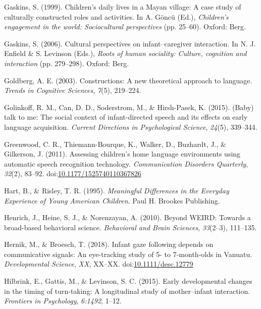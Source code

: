\documentclass[floatsintext,man]{apa6}
\theoremstyle{definition}
\theoremstyle{definition}
\theoremstyle{definition}
\theoremstyle{remark}
\begin{document}
\hypertarget{ref-gaskins1999childrens}{}
Gaskins, S. (1999). Children's daily lives in a Mayan village: A case
study of culturally constructed roles and activities. In A. Göncü (Ed.),
\emph{Children's engagement in the world: Sociocultural perspectives}
(pp. 25--60). Oxford: Berg.

\hypertarget{ref-gaskins2006cultural}{}
Gaskins, S. (2006). Cultural perspectives on infant--caregiver
interaction. In N. J. Enfield \& S. Levinson (Eds.), \emph{Roots of
human sociality: Culture, cognition and interaction} (pp. 279--298).
Oxford: Berg.

\hypertarget{ref-goldberg2003constructions}{}
Goldberg, A. E. (2003). Constructions: A new theoretical approach to
language. \emph{Trends in Cognitive Sciences}, \emph{7}(5), 219--224.

\hypertarget{ref-golinkoff2015baby}{}
Golinkoff, R. M., Can, D. D., Soderstrom, M., \& Hirsh-Pasek, K. (2015).
(Baby) talk to me: The social context of infant-directed speech and its
effects on early language acquisition. \emph{Current Directions in
Psychological Science}, \emph{24}(5), 339--344.

\hypertarget{ref-greenwood2011assessing}{}
Greenwood, C. R., Thiemann-Bourque, K., Walker, D., Buzhardt, J., \&
Gilkerson, J. (2011). Assessing children's home language environments
using automatic speech recognition technology. \emph{Communication
Disorders Quarterly}, \emph{32}(2), 83--92.
doi:\href{https://doi.org/10.1177/1525740110367826}{10.1177/1525740110367826}

\hypertarget{ref-hart1995meaningful}{}
Hart, B., \& Risley, T. R. (1995). \emph{Meaningful Differences in the
Everyday Experience of Young American Children}. Paul H. Brookes
Publishing.

\hypertarget{ref-henrich2010beyond}{}
Henrich, J., Heine, S. J., \& Norenzayan, A. (2010). Beyond WEIRD:
Towards a broad-based behavioral science. \emph{Behavioral and Brain
Sciences}, \emph{33}(2--3), 111--135.

\hypertarget{ref-hernik2018infant}{}
Hernik, M., \& Broesch, T. (2018). Infant gaze following depends on
communicative signals: An eye-tracking study of 5- to 7-month-olds in
Vanuatu. \emph{Developmental Science}, \emph{XX}, XX--XX.
doi:\href{https://doi.org/10.1111/desc.12779}{10.1111/desc.12779}

\hypertarget{ref-hilbrink2015early}{}
Hilbrink, E., Gattis, M., \& Levinson, S. C. (2015). Early developmental
changes in the timing of turn-taking: A longitudinal study of
mother--infant interaction. \emph{Frontiers in Psychology},
\emph{6:1492}, 1--12.
\end{document}
